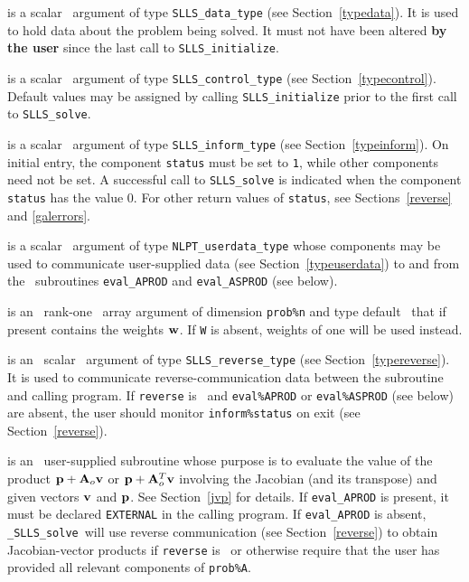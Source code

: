 \documentclass{galahad}
\newcommand{\packagename}{SLLS}
\newcommand{\fullpackagename}{\libraryname\_\packagename}
\newcommand{\solver}{{\tt \fullpackagename\_solve}}
\begin{document}
\begin{description}
 is a scalar \intentinout\ argument of type
{\tt \packagename\_data\_type}
(see Section~\ref{typedata}). It is used to hold data about the problem being
solved. It must not have been altered {\bf by the user} since the last call to
{\tt \packagename\_initialize}.

 is a scalar \intentin\ argument of type
{\tt \packagename\_control\_type}
(see Section~\ref{typecontrol}). Default values may be assigned by calling
{\tt \packagename\_initialize} prior to the first call to
{\tt \packagename\_solve}.

 is a scalar \intentinout\ argument of type
{\tt \packagename\_inform\_type}
(see Section~\ref{typeinform}). On initial entry, the component {\tt status}
must be set to {\tt 1}, while other components need not be set.
A successful call to
{\tt \packagename\_solve}
is indicated when the  component {\tt status} has the value 0.
For other return values of {\tt status}, see Sections~\ref{reverse} and
\ref{galerrors}.

 is a scalar \intentinout\ argument of type
{\tt NLPT\_userdata\_type} whose components may be used
to communicate user-supplied data
(see Section~\ref{typeuserdata})
to and from the \optional\ subroutines
 {\tt eval\_APROD} and {\tt eval\_ASPROD} (see below).

 is an \optional\ rank-one \intentinout\ array argument of dimension 
{\tt prob\%n} and type default \realdp\ that if present contains the weights
${\mathbf{w}}$. If {\tt W} is absent, weights of one will be used instead.

 is an \optional\ scalar \intentinout\ argument of type
{\tt \packagename\_reverse\_type}
(see Section~\ref{typereverse}).
It is used to communicate reverse-communication data between the
subroutine and calling program.
If {\tt reverse} is \present\ and {\tt eval\%APROD} or {\tt eval\%ASPROD}
(see below) are absent, the user should monitor {\tt inform\%status} on exit
(see Section~\ref{reverse}).

 is an \optional\
user-supplied subroutine whose purpose is to evaluate the value of the
product ${\mathbf{p}} + {\mathbf{A}}_o {\mathbf{v}}$ or ${\mathbf{p}} + {\mathbf{A}}_o^T {\mathbf{v}}$
involving the Jacobian (and its transpose) and given vectors ${\mathbf{v}}$ and ${\mathbf{p}}$.
See Section~\ref{jvp} for details.
If {\tt eval\_APROD} is present,
it must be declared {\tt EXTERNAL} in the calling program.
If {\tt eval\_APROD} is absent, \solver\ will use reverse communication
(see Section~\ref{reverse})
to obtain Jacobian-vector products if {\tt reverse} is \present\ or
otherwise require that the user has provided all relevant
components of {\tt prob\%A}.


\end{description}
\end{document}
